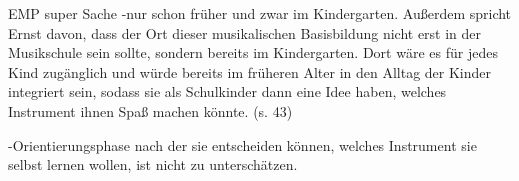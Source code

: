 EMP super Sache -nur schon früher und zwar im Kindergarten. 
Außerdem spricht Ernst davon, dass der Ort dieser musikalischen Basisbildung
nicht erst in der Musikschule sein sollte, sondern bereits im Kindergarten. Dort
wäre es für jedes Kind zugänglich und würde bereits im früheren Alter in den
Alltag der Kinder integriert sein, sodass sie als Schulkinder dann eine Idee
haben, welches Instrument ihnen Spaß machen könnte. (s. 43)

-Orientierungsphase nach der sie entscheiden können, welches Instrument sie
selbst lernen wollen, ist nicht zu unterschätzen. 
